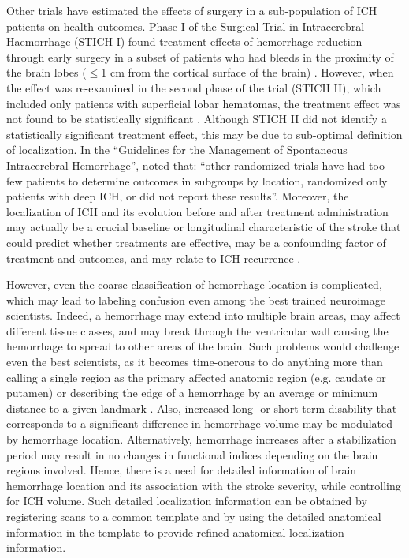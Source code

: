 \documentclass[10pt]{article}\usepackage[]{graphicx}\usepackage[]{color}
\begin{document}
Other trials have estimated the effects of surgery in a sub-population of ICH patients on health outcomes. %
Phase I of the Surgical Trial in Intracerebral Haemorrhage (STICH I) found treatment effects of hemorrhage reduction through early surgery in a subset of patients who had bleeds in the proximity of the brain lobes ($\leq$1 cm from the cortical surface of the brain) \citep{mendelow_early_2005}. However, when the effect was re-examined in the second phase of the trial (STICH II), which included only patients with superficial lobar hematomas, the treatment effect was not found to be statistically significant \citep{mendelow_early_2013}.  Although STICH II did not identify a statistically significant treatment effect, this may be due to sub-optimal definition of localization.  In the ``Guidelines for the Management of Spontaneous Intracerebral Hemorrhage'', \citet{morgenstern_guidelines_2010} noted that: ``other randomized trials have had too few patients to determine outcomes in subgroups by location, randomized only patients with deep ICH, or did not report these results''.  Moreover, the localization of ICH and its evolution before and after treatment administration may actually be a crucial baseline or longitudinal characteristic of the stroke that could predict whether treatments are effective, may be a confounding factor of treatment and outcomes, and may relate to ICH recurrence \citep{fitzmaurice_effect_2008}.  

However, even the coarse classification of hemorrhage location is complicated,  which may lead to labeling confusion even among the best trained neuroimage scientists. Indeed, a hemorrhage may extend into multiple brain areas, may affect different tissue classes, and may break through the ventricular wall causing the hemorrhage to spread to other areas of the brain.  Such problems would challenge even the best scientists, as it becomes time-onerous to do anything more than calling a single region as the primary affected anatomic region (e.g. caudate or putamen) or describing the edge of a hemorrhage by an average or minimum distance to a given landmark \citep{ziai_multicenter_2013}.  Also, increased long- or short-term disability that corresponds to a significant difference in hemorrhage volume may be modulated by hemorrhage location.  Alternatively, hemorrhage increases after a stabilization period may result in no changes in functional indices depending on the brain regions involved. Hence, there is a need for detailed information of brain hemorrhage location and its association with the stroke severity, while controlling for ICH volume.  Such detailed localization information can be obtained by registering scans to a common template and by using the detailed anatomical information in the template to provide refined anatomical localization information.  
\end{document}
